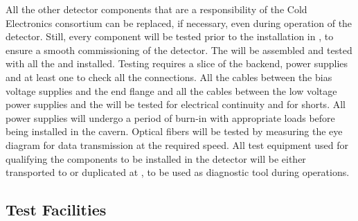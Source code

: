 All the other detector components that are a responsibility of
the Cold Electronics consortium can be replaced, if necessary,
even during operation of the detector. Still, every component
will be tested prior to the installation in \surf, to ensure a
smooth commissioning of the detector. The  will be
assembled and tested with all the  and 
installed. Testing requires a slice of the  backend,
power supplies and at least one  to check all the
connections. All the cables between the bias voltage supplies and
the end flange and all the cables between the low voltage power
supplies and the  will be tested for electrical
continuity and for shorts. All power supplies will undergo a
period of burn-in with appropriate loads before being installed
in the cavern. Optical fibers will be tested by measuring the
eye diagram for data transmission at the required speed. All
test equipment used for qualifying the components to be installed
in the detector will be either transported to \surf or duplicated
at \surf, to be used as diagnostic tool during operations.

\subsection{Test Facilities}
\label{sec:fdsp-tpcelec-production-facilities}


